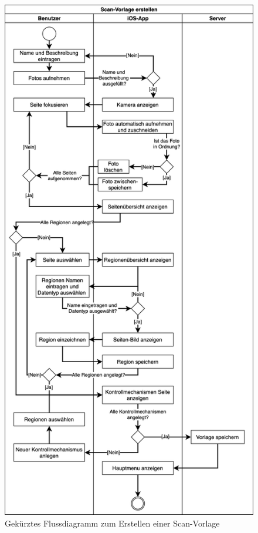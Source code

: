 \documentclass[notables, nomenclature, oneside, 150]{HSMW-Thesis}
\begin{document}
	\begin{figure}[th]
   		\centering
 		\includegraphics[width=\textwidth,height=\textheight,keepaspectratio]{img/erstellen_flow}
   		\caption{Gekürztes Flussdiagramm zum Erstellen einer Scan-Vorlage}
   		\label{fig:erstellen_flow}
   	\end{figure}
   	
\end{document}
